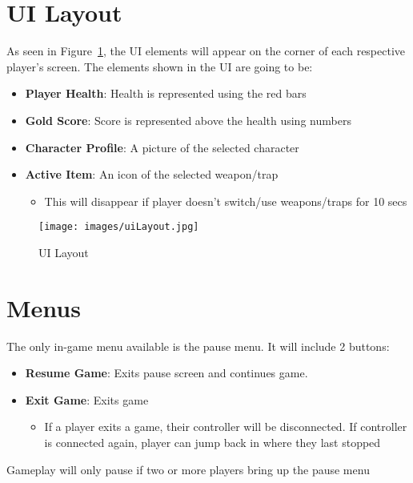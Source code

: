 \documentclass[10pt]{report}
\begin{document}
\section{UI Layout}

As seen in Figure~\ref{fig:uilayout}, the UI elements will appear on the corner of each respective player's screen. The elements shown in the UI are going to be:

\begin{itemize}
    \item \textbf{Player Health}: Health is represented using the red bars
    \item \textbf{Gold Score}: Score is represented above the health using numbers
    \item \textbf{Character Profile}: A picture of the selected character
    \item \textbf{Active Item}: An icon of the selected weapon/trap 
    \begin{itemize}
        \item This will disappear if player doesn’t switch/use weapons/traps for 10 secs
    \end{itemize}
\end{itemize}

\begin{figure}[H]
	\texttt{[image: images/uiLayout.jpg]}
    \caption{UI Layout}
\label{fig:uilayout}
\end{figure}

\section{Menus}

The only in-game menu available is the pause menu. It will include 2 buttons:

\begin{itemize}
    \item \textbf{Resume Game}: Exits pause screen and continues game.
    \item \textbf{Exit Game}: Exits game
    \begin{itemize}
        \item If a player exits a game, their controller will be disconnected. If controller is connected again, player can jump back in where they last stopped 
    \end{itemize}
\end{itemize}

Gameplay will only pause if two or more players bring up the pause menu
\end{document}
